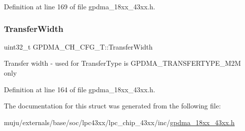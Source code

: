 Definition at line 169 of file gpdma\+\_\+18xx\+\_\+43xx.\+h.

\mbox{\label{struct_g_p_d_m_a___c_h___c_f_g___t_a7aff974420b56393365cc335015ba8df}} 
\subsubsection{\texorpdfstring{Transfer\+Width}{TransferWidth}}
{\footnotesize\ttfamily uint32\+\_\+t G\+P\+D\+M\+A\+\_\+\+C\+H\+\_\+\+C\+F\+G\+\_\+\+T\+::\+Transfer\+Width}

Transfer width -\/ used for Transfer\+Type is G\+P\+D\+M\+A\+\_\+\+T\+R\+A\+N\+S\+F\+E\+R\+T\+Y\+P\+E\+\_\+\+M2M only 

Definition at line 164 of file gpdma\+\_\+18xx\+\_\+43xx.\+h.



The documentation for this struct was generated from the following file\+:\begin{DoxyCompactItemize}
\item 
muju/externals/base/soc/lpc43xx/lpc\+\_\+chip\+\_\+43xx/inc/\hyperlink{gpdma__18xx__43xx_8h}{gpdma\+\_\+18xx\+\_\+43xx.\+h}\end{DoxyCompactItemize}
